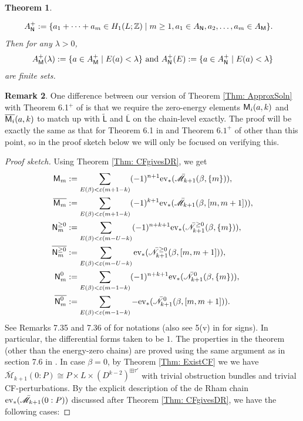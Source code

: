 \documentclass[10pt]{amsart}
\numberwithin{equation}{section}
\theoremstyle{plain}
\newtheorem{theorem}{Theorem}[section]
\theoremstyle{definition}
\newtheorem{remark}[theorem]{Remark}
\theoremstyle{remark}
\numberwithin{equation}{section}
\newcommand{\Z}{\mathbb{Z}}
\newcommand{\ev}{\textup{ev}}
\newcommand{\wt}[1]{\widetilde{#1}}
\newcommand{\ol}[1]{\overline{#1}}
\newcommand{\ms}[1]{\mathscr{#1}}
\newcommand{\MM}{\textup{\textsf{M}}}
\newcommand{\NN}{\textup{\textsf{N}}}
\newcommand{\LL}{\textsf{L}}
\begin{document}
{\begin{theorem}
\begin{enumerate}
\begin{align*}
			A_{\NN}^+&:=\{a_1+\dots + a_m\in H_1(L;\Z)\mid m\geq 1, a_1\in A_{\NN}, a_2,\dots, a_m\in A_\MM\}.
		\end{align*}
		Then for any $\lambda>0$, \[A_\MM^+(\lambda):= \{a\in A_\MM^+\mid E(a)<\lambda\}\textup{ and }A^+_{\NN}(E):=\{ a\in A^+_{\NN}\mid E(a)<\lambda\}\] are finite sets.
	\end{enumerate}
\end{theorem}
\begin{remark}
	One difference between our version of Theorem \ref{Thm: ApproxSoln} with Theorem 6.1$^+$ of \cite{IrieErratum} is that we require the zero-energy elements $\MM_i(a,k)$ and $\ol{\MM_i}(a,k)$ to match up with $\wt{\LL}$ and $\ol{\LL}$ on the chain-level exactly. The proof will be exactly the same as that for Theorem 6.1 in \cite{Irie2} and Theorem $6.1^+$ of \cite{IrieErratum} other than this point, so in the proof sketch below we will only be focused on verifying this.
\end{remark}


\begin{proof}[Proof sketch]
	Using Theorem \ref{Thm: CFgivesDR}, we get
	\begin{align*}
		\MM_m &:= \sum_{E(\beta)< \varepsilon(m+1-k)} (-1)^{n+1}\ev_* (\bar{\ms{M}}_{k+1}(\beta,\{m\})),\\
		\ol{\MM_m}&:= \sum_{E(\beta)<\varepsilon(m+1-k)} (-1)^{k+1} \ev_*(\bar{\ms{M}}_{k+1}(\beta,[m,m+1])),\\
		\NN^{\geq 0}_m&:= \sum_{E(\beta) < \varepsilon(m-U-k)} (-1)^{n+k+1} \ev_*(\bar{\ms{N}}_{k+1}^{\geq 0}(\beta, \{m\})),\\
		\ol{\NN^{\geq 0}_m}&:= \sum_{E(\beta) < \varepsilon(m-U-k)} \ev_*(\bar{\ms{N}}_{k+1}^{\geq 0}(\beta, [m,m+1])), \\
		\NN^{0}_m &:= \sum_{E(\beta) < \varepsilon(m-1-k)} (-1)^{n+k+1} \ev_* (\bar {\ms{N}}_{k+1}^0 (\beta,\{m\})), \\
		\ol{\NN^{0}_m} &:= \sum_{E(\beta) < \varepsilon(m-1-k)} -\ev_*(\bar{\ms{N}}_{k+1}^0 (\beta, [m,m+1])). 
	\end{align*}
	See Remarks 7.35 and 7.36 of \cite{Irie2} for notations (also see 5(v) in \cite{IrieErratum} for signs). In particular, the differential forms taken to be $1$.
	The properties in the theorem (other than the energy-zero chains) are proved using the same argument as in section 7.6 in \cite{Irie2}. In case $\beta=0$,  by Theorem \ref{Thm: ExistCF} we we have $\bar{\ms{M}}_{k+1}(0:P)\cong P\times L\times (D^{k-2})^{\boxplus \tau'}$ with trivial obstruction bundles and trivial CF-perturbations.
	By the explicit description of the de Rham chain $\ev_*(\bar{\ms{M}}_{k+1}(0:P))$ discussed after Theorem \ref{Thm: CFgivesDR}, we have the following cases:



\end{proof}}
\end{document}
